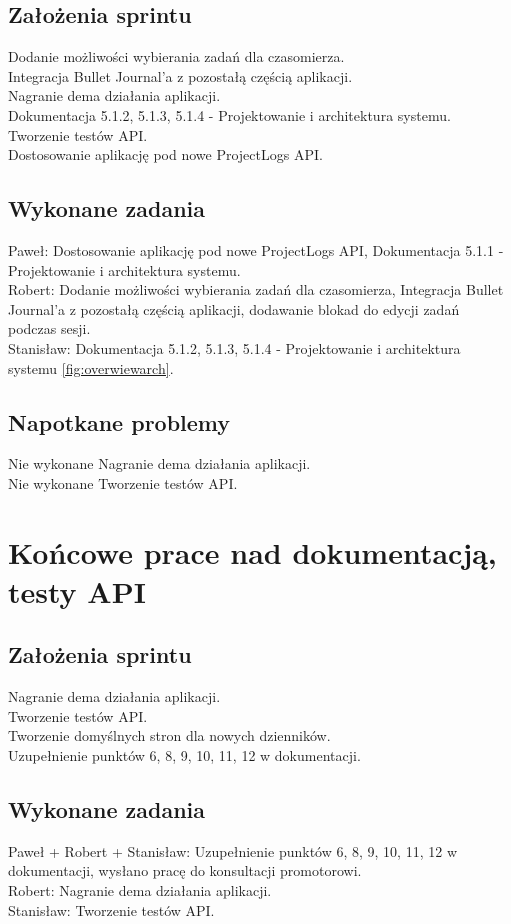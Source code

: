 \documentclass[a4paper,11pt]{report}
\begin{document}
\subsection {Założenia sprintu}
Dodanie możliwości wybierania zadań dla czasomierza.\\
Integracja Bullet Journal’a z pozostałą częścią aplikacji.\\
Nagranie dema działania aplikacji.\\
Dokumentacja 5.1.2, 5.1.3, 5.1.4 - Projektowanie i architektura systemu.\\
Tworzenie testów API.\\
Dostosowanie aplikację pod nowe ProjectLogs API.\\
\subsection {Wykonane zadania}
Paweł: Dostosowanie aplikację pod nowe ProjectLogs API, Dokumentacja 5.1.1 - Projektowanie i architektura systemu.\\
Robert: Dodanie możliwości wybierania zadań dla czasomierza, Integracja Bullet Journal’a z pozostałą częścią aplikacji, dodawanie blokad do edycji zadań podczas sesji. \\
Stanisław: Dokumentacja 5.1.2, 5.1.3, 5.1.4 - Projektowanie i architektura systemu \ref{fig:overwiewarch}.\\
\subsection {Napotkane problemy}
Nie wykonane Nagranie dema działania aplikacji.\\
Nie wykonane Tworzenie testów API.\\

\section {Końcowe prace nad dokumentacją, testy API}
\subsection {Założenia sprintu}
Nagranie dema działania aplikacji.\\
Tworzenie testów API.\\
Tworzenie domyślnych stron dla nowych dzienników.\\
Uzupełnienie punktów 6, 8, 9, 10, 11, 12 w dokumentacji.\\
\subsection {Wykonane zadania}
Paweł + Robert + Stanisław: Uzupełnienie punktów 6, 8, 9, 10, 11, 12 w dokumentacji, wysłano pracę do konsultacji promotorowi.\\
Robert: Nagranie dema działania aplikacji.\\
Stanisław: Tworzenie testów API.\\
\end{document}

